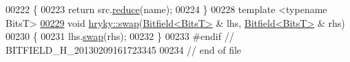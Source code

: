 \begin{DoxyCode}
00222 \{
00223     \textcolor{keywordflow}{return} src.\hyperlink{classhryky_1_1_bitfield_a5cebc48b87ae30dfa43cbcbda5cc9de8}{reduce}(name);
00224 \}
00228 \textcolor{keyword}{template} <\textcolor{keyword}{typename} BitsT>
\hypertarget{bitfield_8h_source_l00229}{}\hyperlink{namespacehryky_aceca391630a418ef4d4abb33e68458c9}{00229} \textcolor{keywordtype}{void} \hyperlink{namespacehryky_a4282146df5ea2b68cb667896a2205909}{hryky::swap}(\hyperlink{classhryky_1_1_bitfield}{Bitfield<BitsT>} & lhs, \hyperlink{classhryky_1_1_bitfield}{Bitfield<BitsT>} & rhs)
00230 \{
00231     lhs.\hyperlink{classhryky_1_1_bitfield_a8425c4e2e86ec47dca85a13fdcee5ee0}{swap}(rhs);
00232 \}
00233 \textcolor{preprocessor}{#endif // BITFIELD\_H\_20130209161723345}
00234 \textcolor{preprocessor}{}\textcolor{comment}{// end of file}
\end{DoxyCode}
